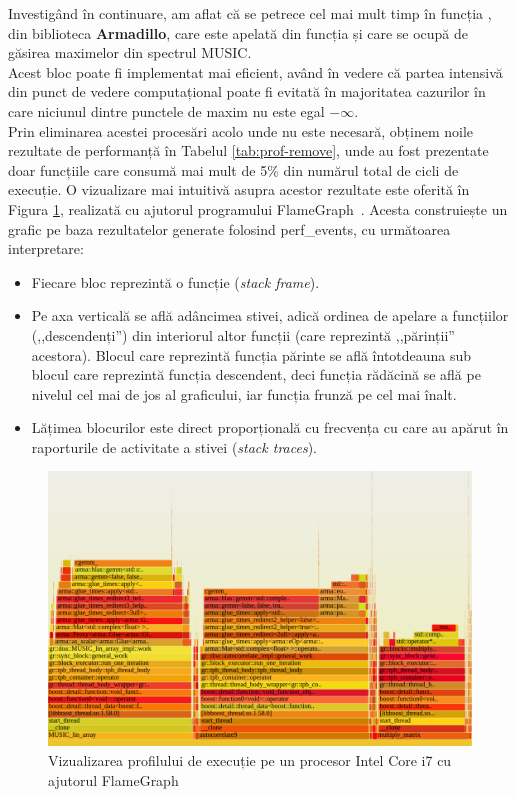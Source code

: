 Investigând în continuare, am aflat că se petrece cel mai mult timp în funcția
 , din biblioteca
\textbf{Armadillo}, care este apelată din funcția  și care
se ocupă de găsirea maximelor din spectrul MUSIC. \\ 

Acest bloc poate fi implementat mai eficient, având în vedere că partea
intensivă din punct de vedere computațional poate fi evitată în majoritatea
cazurilor în care niciunul dintre punctele de maxim nu este egal $-\infty$. \\

Prin eliminarea acestei procesări acolo unde nu este necesară, obținem noile
rezultate de performanță în Tabelul \ref{tab:prof-remove}, unde au fost
prezentate doar funcțiile care consumă mai mult de 5\% din numărul total de
cicli de execuție. O vizualizare mai intuitivă asupra acestor rezultate este
oferită în Figura \ref{fig:profile-flamegraph}, realizată cu ajutorul
programului FlameGraph~\cite{flamegraph}. Acesta construiește un grafic pe baza
rezultatelor generate folosind perf\_events, cu următoarea interpretare:

\begin{itemize}
  \item Fiecare bloc reprezintă o funcție (\textit{stack frame}).
  \item Pe axa verticală se află adâncimea stivei, adică ordinea de apelare a
  funcțiilor (,,descendenți'') din interiorul altor funcții (care reprezintă
  ,,părinții'' acestora). Blocul care reprezintă funcția părinte se află
  întotdeauna sub blocul care reprezintă funcția descendent, deci funcția
  rădăcină se află pe nivelul cel mai de jos al graficului, iar funcția frunză
  pe cel mai înalt.
  \item Lățimea blocurilor este direct proporțională cu frecvența cu care au
  apărut în raporturile de activitate a stivei (\textit{stack traces}).
\end{itemize}



\begin{figure}[h]
    \centering
    \includegraphics[width=1\textwidth]{src/img/flamegraph-orig-fs}
    \caption{Vizualizarea profilului de execuție pe un procesor Intel Core i7 cu ajutorul FlameGraph}
    \label{fig:profile-flamegraph}
\end{figure}

